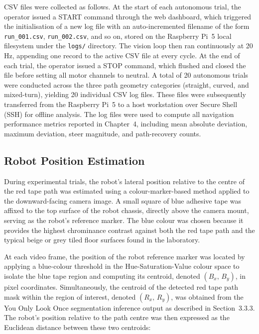 CSV files were collected as follows. At the start of each autonomous trial,
the operator issued a START command through the web dashboard, which triggered
the initialisation of a new log file with an auto-incremented filename of the
form \texttt{run\_001.csv}, \texttt{run\_002.csv}, and so on, stored on the
Raspberry Pi~5 local filesystem under the \texttt{logs/} directory. The vision
loop then ran continuously at 20\,Hz, appending one record to the active CSV
file at every cycle. At the end of each trial, the operator issued a STOP
command, which flushed and closed the file before setting all motor channels
to neutral. A total of 20 autonomous trials were conducted across the three
path geometry categories (straight, curved, and mixed-turn), yielding 20
individual CSV log files. These files were subsequently transferred from the
Raspberry Pi~5 to a host workstation over Secure Shell (SSH) for offline
analysis. The log files were used to compute all navigation performance metrics
reported in Chapter~4, including mean absolute deviation, maximum deviation,
steer magnitude, and path-recovery counts.

\subsection{Robot Position Estimation}

During experimental trials, the robot's lateral position relative to the
centre of the red tape path was estimated using a colour-marker-based method
applied to the downward-facing camera image. A small square of blue adhesive
tape was affixed to the top surface of the robot chassis, directly above the
camera mount, serving as the robot's reference marker. The blue colour was
chosen because it provides the highest chrominance contrast against both the
red tape path and the typical beige or grey tiled floor surfaces found in the
laboratory.

At each video frame, the position of the robot reference marker was located
by applying a blue-colour threshold in the Hue-Saturation-Value colour space
to isolate the blue tape region and computing its centroid, denoted
$(B_x,\,B_y)$, in pixel coordinates. Simultaneously, the centroid of the
detected red tape path mask within the region of interest, denoted
$(R_x,\,R_y)$, was obtained from the You Only Look Once segmentation
inference output as described in Section~3.3.3. The robot's position
relative to the path centre was then expressed as the Euclidean distance
between these two centroids:

